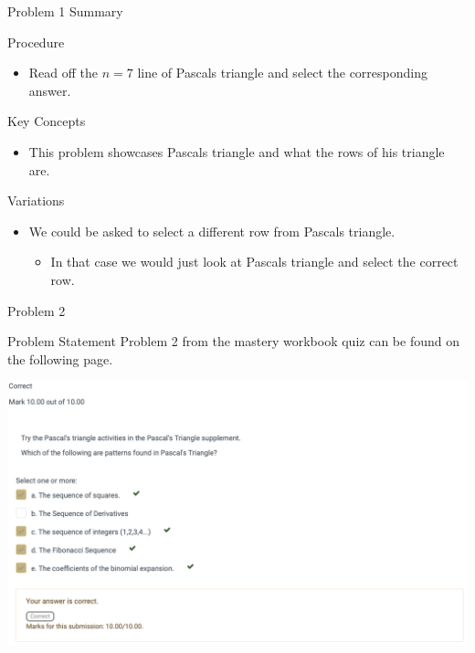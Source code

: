 \begin{summary}{Problem 1 Summary}
    \begin{statement}{Procedure}
        \begin{itemize}
            \item Read off the $n = 7$ line of Pascals triangle and select the corresponding answer.
        \end{itemize}
    \end{statement}
    \begin{statement}{Key Concepts}
        \begin{itemize}
            \item This problem showcases Pascals triangle and what the rows of his triangle are.
        \end{itemize}
    \end{statement}
    \begin{statement}{Variations}
        \begin{itemize}
            \item We could be asked to select a different row from Pascals triangle.
            \begin{itemize}
                \item In that case we would just look at Pascals triangle and select the correct row.
            \end{itemize}
        \end{itemize}
    \end{statement}
\end{summary}

\begin{problem}{Problem 2}
    \begin{statement}{Problem Statement}
        Problem 2 from the mastery workbook quiz can be found on the following page.
    \end{statement}
    \begin{highlight}[Solution]
        \begin{center}
            \includegraphics[width = 1.0\textwidth]{Images/Problem 2.png}
        \end{center}
    \end{highlight}
\end{problem}

